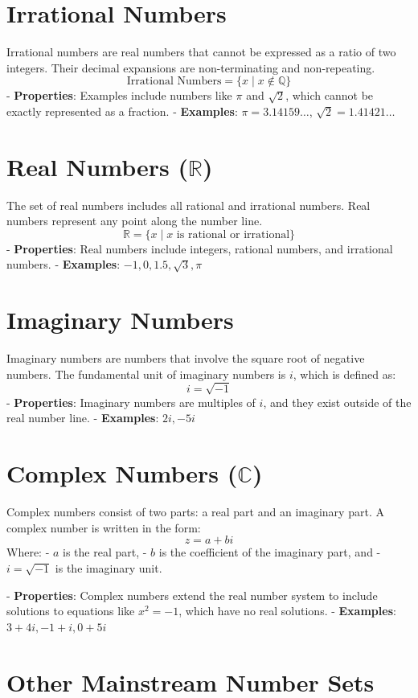 \documentclass{article}
\begin{document}
\section{Irrational Numbers}
Irrational numbers are real numbers that cannot be expressed as a ratio of two integers. Their decimal expansions are non-terminating and non-repeating.
\[
\text{Irrational Numbers} = \{ x \mid x \notin \mathbb{Q} \}
\]
- \textbf{Properties}: Examples include numbers like \( \pi \) and \( \sqrt{2} \), which cannot be exactly represented as a fraction.
- \textbf{Examples}: \( \pi = 3.14159\ldots \), \( \sqrt{2} = 1.41421\ldots \)

\section{Real Numbers (\( \mathbb{R} \))}
The set of real numbers includes all rational and irrational numbers. Real numbers represent any point along the number line.
\[
\mathbb{R} = \{ x \mid x \text{ is rational or irrational} \}
\]
- \textbf{Properties}: Real numbers include integers, rational numbers, and irrational numbers.
- \textbf{Examples}: \( -1, 0, 1.5, \sqrt{3}, \pi \)

\section{Imaginary Numbers}
Imaginary numbers are numbers that involve the square root of negative numbers. The fundamental unit of imaginary numbers is \( i \), which is defined as:
\[
i = \sqrt{-1}
\]
- \textbf{Properties}: Imaginary numbers are multiples of \( i \), and they exist outside of the real number line.
- \textbf{Examples}: \( 2i, -5i \)

\section{Complex Numbers (\( \mathbb{C} \))}
Complex numbers consist of two parts: a real part and an imaginary part. A complex number is written in the form:
\[
z = a + bi
\]
Where:
- \( a \) is the real part,
- \( b \) is the coefficient of the imaginary part, and
- \( i = \sqrt{-1} \) is the imaginary unit.

- \textbf{Properties}: Complex numbers extend the real number system to include solutions to equations like \( x^2 = -1 \), which have no real solutions.
- \textbf{Examples}: \( 3 + 4i, -1 + i, 0 + 5i \)

\section{Other Mainstream Number Sets}
\end{document}
